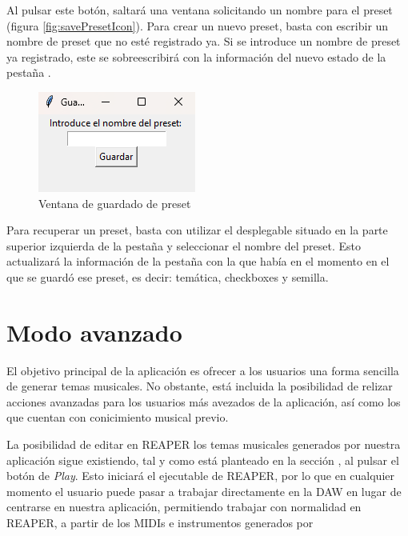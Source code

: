 Al pulsar este botón, saltará una ventana solicitando un nombre para el preset (figura \ref{fig:savePresetIcon}). Para crear un nuevo preset, basta con escribir un nombre de preset que no esté registrado ya. Si se introduce un nombre de preset ya registrado, este se sobreescribirá con la información del nuevo estado de la pestaña \tematicTabName{}.

\begin{figure}[h]
    \begin{center}
        \includegraphics[scale=0.85]{Imagenes/Bitmap/savePresetWindow.png}
    \end{center}
    \caption{Ventana de guardado de preset}
    \label{fig:savePresetWindow}
\end{figure}

Para recuperar un preset, basta con utilizar el desplegable situado en la parte superior izquierda de la pestaña y seleccionar el nombre del preset. Esto actualizará la información de la pestaña con la que había en el momento en el que se guardó ese preset, es decir: temática, checkboxes y semilla.

\section{Modo avanzado}
\label{sec:app:advancedMode}
El objetivo principal de la aplicación es ofrecer a los usuarios una forma sencilla de generar temas musicales. No obstante, está incluida la posibilidad de relizar acciones avanzadas para los usuarios más avezados de la aplicación, así como los que cuentan con conicimiento musical previo.

La posibilidad de editar en REAPER los temas musicales generados por nuestra aplicación sigue existiendo, tal y como está planteado en la sección , al pulsar el botón de \textit{Play}. Esto iniciará el ejecutable de REAPER, por lo que en cualquier momento el usuario puede pasar a trabajar directamente en la DAW en lugar de centrarse en nuestra aplicación, permitiendo trabajar con normalidad en REAPER, a partir de los MIDIs e instrumentos generados por \appName{}

